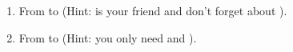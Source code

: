 \begin{enumerate}
{\begin{argumentN}[1]








\end{argumentN}
}



\item 

 From  to  (Hint: 
 \disjE{} is your friend and don't forget about \disjI).

 \opts{

  \dotline
  \dotline
  \dotline
  \dotline
  \dotline
  \dotline
  \dotline
  \dotline
  \dotline
  \dotline
  \dotline
 }
 {
\begin{argumentN}[1]








\end{argumentN}
 }

\newpage
\item From  to  (Hint: you only need \conjE{} and \conjI{}).

 \opts{

  \dotline
  \dotline
  \dotline
  \dotline
  \dotline
  \dotline
  \dotline
  \dotline
  \dotline
  \dotline
  \dotline
  \dotline
  \dotline
 }
 {
\begin{argumentN}[1]



\end{argumentN}}
\end{enumerate}
